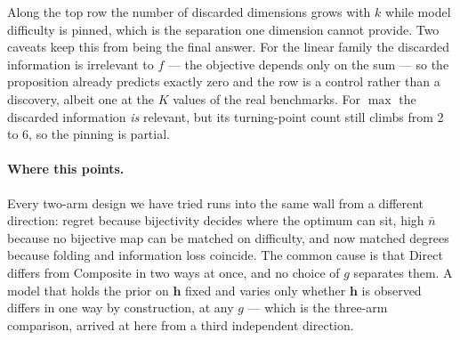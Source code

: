 \noindent Along the top row the number of discarded dimensions grows with $k$
while model difficulty is pinned, which is the separation one dimension cannot
provide. Two caveats keep this from being the final answer. For the linear
family the discarded information is irrelevant to $f$ --- the objective depends
only on the sum --- so the proposition already predicts exactly zero and the
row is a control rather than a discovery, albeit one at the $K$ values of the
real benchmarks. For $\max$ the discarded information \emph{is} relevant, but
its turning-point count still climbs from 2 to 6, so the pinning is partial.

\paragraph{Where this points.} Every two-arm design we have tried runs into the
same wall from a different direction: regret because bijectivity decides where
the optimum can sit, high $\bar n$ because no bijective map can be matched on
difficulty, and now matched degrees because folding and information loss
coincide. The common cause is that Direct differs from Composite in two ways at
once, and no choice of $g$ separates them. A model that holds the prior on
$\mathbf h$ fixed and varies only whether $\mathbf h$ is observed differs in one
way by construction, at any $g$ --- which is the three-arm comparison, arrived
at here from a third independent direction.
